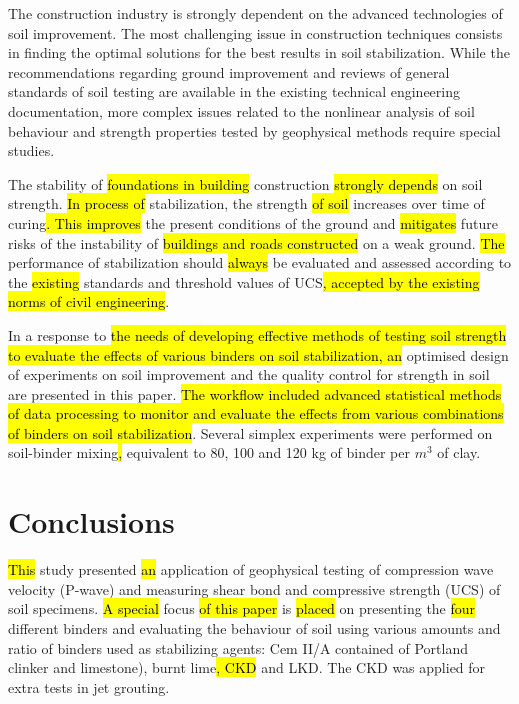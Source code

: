 \documentclass[USenglish,twocolumn]{article}
\begin{document}
The construction industry is strongly dependent on the advanced technologies of soil improvement. The most challenging issue in construction techniques consists in finding the optimal solutions for the best results in soil stabilization. While the recommendations regarding ground improvement and reviews of general standards of soil testing are available in the existing technical engineering documentation, more complex issues related to the nonlinear analysis of soil behaviour and strength properties tested by geophysical methods require special studies.  

The stability of \hl{foundations in building }construction\hl{ strongly depends }on\hl{ }soil strength. \hl{In process of }stabilization, the strength \hl{of soil }increases over time of curing\hl{. This improves }the present conditions of the ground and \hl{mitigates} future risks of the instability of \hl{buildings and roads constructed }on a weak ground. \hl{The }performance of stabilization should \hl{always }be evaluated and assessed according to the \hl{existing} standards and\hl{ }threshold values of UCS\hl{, accepted by the existing norms of civil engineering}. 

In a response to\hl{ the needs of developing effective methods of testing soil strength to evaluate the effects of various binders on soil stabilization, an} optimised design of experiments on soil improvement\hl{ }and the quality control for strength in soil are presented in this paper. \hl{The workflow included advanced statistical methods of data processing to monitor and evaluate the effects from various combinations of binders on soil stabilization}. Several simplex experiments were performed on soil-binder mixing\hl{, }equivalent to 80, 100 and 120 kg of binder per $m^3$ of clay.

\section{Conclusions}

 \hl{This }study presented \hl{an} application of geophysical testing of compression wave velocity (P-wave) and measuring\hl{ }shear bond and compressive strength (UCS) of soil specimens. \hl{A special }focus \hl{of this paper} is \hl{placed }on presenting the \hl{four} different binders and evaluating the behaviour of soil using various amounts and ratio of binders used as stabilizing agents: Cem II/A contained of Portland clinker and limestone), burnt lime\hl{, CKD} and LKD. The CKD was applied for extra tests in jet grouting. 
\end{document}
